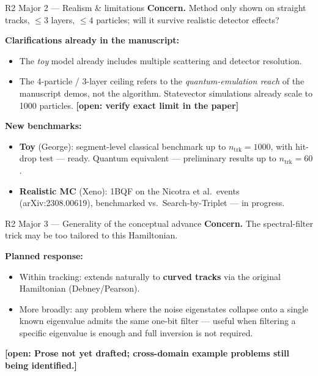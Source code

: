 \documentclass[aspectratio=169]{beamer}
\newcommand{\openflag}[1]{{\color{orange}\textbf{[open: #1]}}}
\begin{document}
\begin{frame}{R2 Major 2 --- Realism \& limitations}
\textbf{Concern.} Method only shown on straight tracks, $\le 3$ layers, $\le 4$ particles; will it survive realistic detector effects?
\smallskip

\textbf{Clarifications already in the manuscript:}
\begin{itemize}\small
  \item The \emph{toy} model already includes multiple scattering and detector resolution.
  \item The 4-particle / 3-layer ceiling refers to the \emph{quantum-emulation reach} of the manuscript demos, not the algorithm. Statevector simulations already scale to 1000 particles. \hfill\openflag{verify exact limit in the paper}
\end{itemize}
\smallskip

\textbf{New benchmarks:}
\begin{itemize}\small
  \item \textbf{Toy} (George): segment-level classical benchmark up to $n_{\mathrm{trk}}=1000$, with hit-drop test --- ready. Quantum equivalent --- preliminary results up to $n_{\mathrm{trk}}=60$.
  \item \textbf{Realistic MC} (Xeno): 1BQF on the Nicotra et al.\ events (arXiv:2308.00619), benchmarked vs.\ Search-by-Triplet --- in progress.
\end{itemize}
\end{frame}

\begin{frame}{R2 Major 3 --- Generality of the conceptual advance}
\textbf{Concern.} The spectral-filter trick may be too tailored to this Hamiltonian.
\smallskip

\textbf{Planned response:}
\begin{itemize}
  \item Within tracking: extends naturally to \textbf{curved tracks} via the original Hamiltonian (Debney/Pearson).
  \item More broadly: any problem where the noise eigenstates collapse onto a single known eigenvalue admits the same one-bit filter --- useful when filtering a specific eigenvalue is enough and full inversion is not required.
\end{itemize}
\smallskip
\openflag{Prose not yet drafted; cross-domain example problems still being identified.}
\end{frame}
\end{document}

